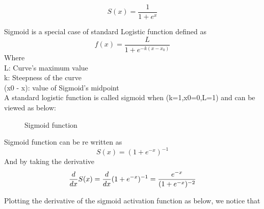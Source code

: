 \begin{equation}
	S(x) = \frac{1}{ 1+ e^x}
\end{equation}

Sigmoid is a special case of standard Logistic function defined as 
\begin{equation}
f(x) = \frac{L}{ 1+ e^{-k(x-x_0)}}
\end{equation}
Where \\
L: Curve's maximum value \\
k: Steepness of the curve \\
(x0 - x): value of Sigmoid's midpoint \\

A standard logistic function is called sigmoid when (k=1,x0=0,L=1) and can be viewed as below: \\
\begin{figure}[h]
	\centering
	\caption{Sigmoid function}
	\label{fig:Sigmoid-function}
\end{figure}

Sigmoid function can be re written as  \\
\begin{equation}
	S(x) = (1+e^{-x})^{-1}
\end{equation}
And by taking the derivative \\
\begin{equation}
\frac{d}{dx}S(x) = \frac{d}{dx} (1+e^{-x})^{-1} \\
= \frac{e^{-x}} {(1+e^{-x})^{-2}} 
\end{equation}

Plotting the derivative of the sigmoid activation function as below, we notice that 
\begin{center}

\end{center}

